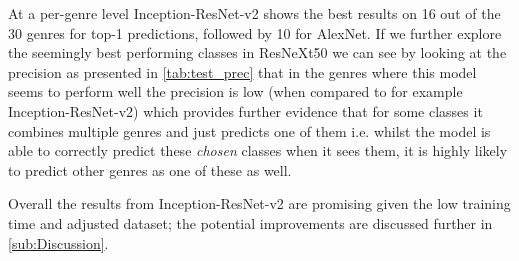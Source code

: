 \documentclass[12pt]{article}
\numberwithin{equation}{section}
\numberwithin{figure}{section}
\begin{document}
At a per-genre level Inception-ResNet-v2 shows the best results on 16 out of the 30 genres for top-1 predictions, followed by 10 for AlexNet. If we further explore the seemingly best performing classes in ResNeXt50 we can see by looking at the precision as presented in \cref{tab:test_prec} that in the genres where this model seems to perform well the precision is low (when compared to for example Inception-ResNet-v2) which provides further evidence that for some classes it combines multiple genres and just predicts one of them i.e. whilst the model is able to correctly predict these \emph{chosen}	classes when it sees them, it is highly likely to predict other genres as one of these as well.

Overall the results from Inception-ResNet-v2 are promising given the low training time and adjusted dataset; the potential improvements are discussed further in \cref{sub:Discussion}.
\end{document}
